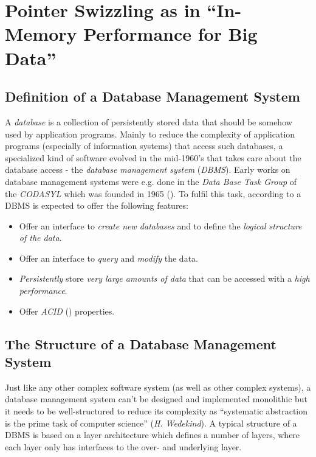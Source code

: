 \chapter[Pointer Swizzling in the DBMS Buffer Management]{Pointer Swizzling as in ``In-Memory Performance for Big Data'' \cite{Graefe:2014}} \label{ch:paper}

\section[Definition of a Database Management System]{Definition of a Database Management System}

	A \emph{database} is a collection of persistently stored data that should be somehow used by application programs. Mainly to reduce the complexity of application programs (especially of information systems) that access such databases, a specialized kind of software evolved in the mid-1960's that takes care about the database access - the \emph{database management system} (\emph{DBMS}). Early works on database management systems were e.g. done in the \emph{Data Base Task Group} of the \emph{CODASYL} which was founded in 1965 (\cite{wikipedia.En_Data_Base_Task_Group}). To fulfil this task, according to \cite{Database_Systems_-_The_Complete_Book} a DBMS is expected to offer the following features:
	\begin{itemize}
		\item	Offer an interface to \emph{create new databases} and to define the \emph{logical structure of the data}.
		\item	Offer an interface to \emph{query} and \emph{modify} the data.
		\item	\emph{Persistently} store \emph{very large amounts of data} that can be accessed with a \emph{high performance}.
		\item	Offer \emph{ACID} (\cite{HaerderReuter83}) properties.
	\end{itemize}
	
\section[Structure of a DBMS]{The Structure of a Database Management System}

	Just like any other complex software system (as well as other complex systems), a database management system can't be designed and implemented monolithic but it needs to be well-structured to reduce its complexity as ``systematic abstraction is the prime task of computer science'' (\emph{H. Wedekind}). A typical structure of a DBMS is based on a layer architecture which defines a number of layers, where each layer only has interfaces to the over- and underlying layer.
	
